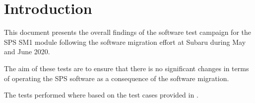 \section{Introduction}

This document presents the overall findings of the software test campaign for the SPS SM1
module following the software migration effort at Subaru during May and June 2020.

The aim of these tests are to ensure that there is no significant changes in terms of operating
the SPS software as a consequence of the software migration.

The tests performed where based on the test cases provided in \cite{LAMTRE1072}.

